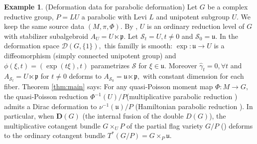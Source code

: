 \documentclass[reqno]{amsart}
\theoremstyle{plain}
\theoremstyle{definition}
\newtheorem{Exp}[Thm]{Example}
\newcommand{\too}{\longrightarrow}
\renewcommand{\S}{\mathcal{S}}
\newcommand{\D}{\mathcal{D}}
\begin{document}
\begin{Exp}(Deformation data for parabolic deformation) Let $G$ be a complex reductive group, $P = LU$ a parabolic with Levi $L$ and unipotent subgroup $U.$ We keep the same source data $(M,\pi,\Phi).$ By \cite[]{bualibanu2026reduction}, $U$ is an ordinary reduction level of $G$ with stabilizer subalgebroid $A_U = U \ltimes \mathfrak{p}.$ Let $\S_t = U, t\neq 0$ and $\S_0 = \mathfrak{u}.$ In the deformation space $\D(G,\{1\}),$ this familly is smooth: $\exp: \mathfrak{u} \too U$ is a diffeomorphism (simply connected unipotent group) and $\phi(\xi,t) = (\exp(t\xi),t)$ parametrizes $\S$ for $\xi \in \mathfrak{u}.$ Moreover $\widehat{\gamma}_t = 0, \forall t$ and $A_{\S_t} = U \ltimes \mathfrak{p}$ for $t\neq 0$ deforms to $A_{\S_0} = \mathfrak{u} \ltimes \mathfrak{p},$ with constant dimension for each fiber. Theorem \ref{thm:main} says: For any quasi-Poisson moment map $\Phi: M\too G,$ the quasi-Poisson reduction $\Phi^{-1}(U)/P$(multiplicative parabolic reduction \cite[]{bualibanu2026reduction})  admits a Dirac deformation to $\nu^{-1}(\mathfrak{u})/P$ (Hamiltonian parabolic reduction \cite[]{bualibanu2026reduction}). In particular, when $\mathbf{D}(G)$ (the internal fusion of the double $D(G)$), the multiplicative cotangent bundle $G \times_{U} P$ of the partial flag variety $G/P$ (\cite[]{bualibanu2026reduction}) deforms to the ordinary cotangent bundle $T^{*}(G/P) = G\times_{P} \mathfrak{u}.$
\end{Exp}
\end{document}
